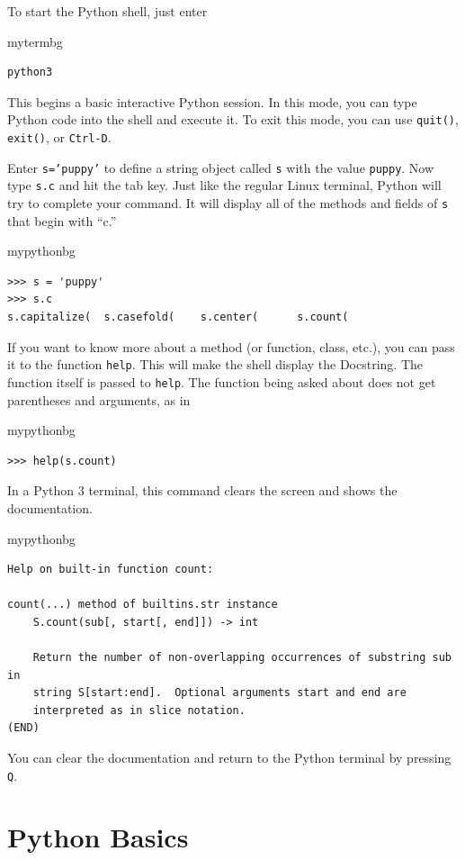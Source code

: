 To start the Python shell, just enter
\begin{tsession}{mytermbg}
\begin{verbatim}
python3
\end{verbatim}
\end{tsession}
This begins a basic interactive Python session.
In this mode, you can type Python code into the shell and execute it.
To exit this mode, you can use \texttt{quit()}, \texttt{exit()}, or \texttt{Ctrl-D}.

Enter \texttt{s='puppy'} to define a string object called \texttt{s} with the value \texttt{puppy}.
Now type \texttt{s.c} and hit the tab key.
Just like the regular Linux terminal, Python will try to complete your command.
It will display all of the methods and fields of \texttt{s} that begin with ``c.''
\begin{tsession}{mypythonbg}
\begin{verbatim}
>>> s = 'puppy'
>>> s.c
s.capitalize(  s.casefold(    s.center(      s.count(       
\end{verbatim}
\end{tsession}
If you want to know more about a method (or function, class, etc.),
you can pass it to the function \texttt{help}.
This will make the shell display the Docstring.
The function itself is passed to \texttt{help}.
The function being asked about does not get parentheses and arguments, as in
\begin{tsession}{mypythonbg}
\begin{verbatim}
>>> help(s.count)
\end{verbatim}
\end{tsession}
In a Python 3 terminal, this command clears the screen and shows the documentation.
\begin{tsession}{mypythonbg}
\begin{verbatim}
Help on built-in function count:

count(...) method of builtins.str instance
    S.count(sub[, start[, end]]) -> int
    
    Return the number of non-overlapping occurrences of substring sub in
    string S[start:end].  Optional arguments start and end are
    interpreted as in slice notation.
(END)
\end{verbatim}
\end{tsession}
You can clear the documentation and return to the Python terminal by pressing \texttt{Q}.

\section{Python Basics}
